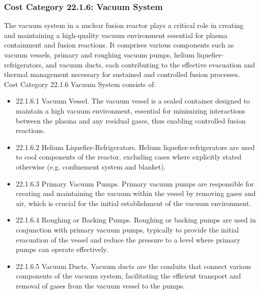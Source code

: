 
\subsubsection*{Cost Category 22.1.6: Vacuum System}

The vacuum system in a nuclear fusion reactor plays a critical role in creating and maintaining a high-quality vacuum environment essential for plasma containment and fusion reactions. It comprises various components such as vacuum vessels, primary and roughing vacuum pumps, helium liquefier-refrigerators, and vacuum ducts, each contributing to the effective evacuation and thermal management necessary for sustained and controlled fusion processes. Cost Category 22.1.6 Vacuum System consists of:

\begin{itemize}
    \item 22.1.6.1 Vacuum Vessel.  The vacuum vessel is a sealed container designed to maintain a high vacuum environment, essential for minimizing interactions between the plasma and any residual gases, thus enabling controlled fusion reactions.

    \item 22.1.6.2 Helium Liquefier-Refrigerators. Helium liquefier-refrigerators are used to cool components of the reactor, excluding cases where explicitly stated otherwise (e.g. confinement system and blanket).

    \item 22.1.6.3 Primary Vacuum Pumps. Primary vacuum pumps are responsible for creating and maintaining the vacuum within the vessel by removing gases and air, which is crucial for the initial establishment of the vacuum environment.

    \item 22.1.6.4 Roughing or Backing Pumps. Roughing or backing pumps are used in conjunction with primary vacuum pumps, typically to provide the initial evacuation of the vessel and reduce the pressure to a level where primary pumps can operate effectively.

    \item 22.1.6.5 Vacuum Ducts. Vacuum ducts are the conduits that connect various components of the vacuum system, facilitating the efficient transport and removal of gases from the vacuum vessel to the pumps.
\end{itemize}

